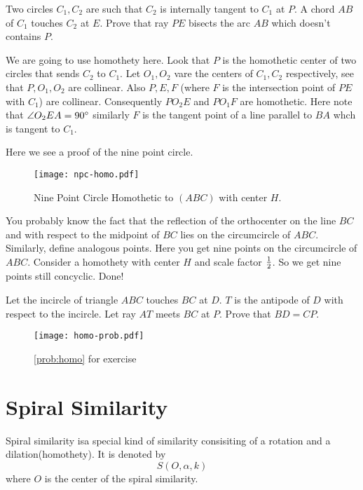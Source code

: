 \begin{example}
Two circles $C_1, C_2$ are such that $C_2$ is internally tangent  to $C_1$ at $P$. A chord $AB$ of $C_1$ touches $C_2$ at $E$. Prove that ray $PE$ bisects the arc $AB$ which doesn't contains $P$.
\end{example}

We are going to use homothety here. Look
 that $P$ is the homothetic center of two 
 circles that sends $C_2$ to $C_1$.
Let $O_1, O_2$ vare the centers of $C_1, C_2$ respectively, see that $P,O_1,O_2$ are collinear.
Also $P,E,F$ (where $F$ is the intersection point of $PE$ with $C_1$) are collinear. Consequently $PO_2E$ and $PO_1F$ are homothetic. Here note that $\angle O_2EA=90^\circ$ similarly $F$ is the tangent point of a line parallel to $BA$ whch is tangent to $C_1$. 

Here we see a proof of the nine point circle.
\begin{figure}[H]
\centering
	\texttt{[image: npc-homo.pdf]}%
	\caption{Nine Point Circle Homothetic to $(ABC)$ with center $H$.}
\end{figure}
You probably know the fact that the reflection of the orthocenter on the line $BC$ and with respect to the midpoint of $BC$ lies on the circumcircle of $ABC$.
Similarly, define analogous points.
Here you get nine points on the circumcircle of $ABC$. Consider a homothety with center $H$ and scale factor $\frac{1}{2}$. So we get nine points still concyclic. Done!

\begin{problem}\label{prob:homo}
Let the incircle of triangle $ABC$ touches $BC$ at $D$. $T$ is the antipode of $D$ with respect to the incircle. Let ray $AT$ meets $BC$ at $P$. Prove that $BD=CP.$
\end{problem}


\begin{figure}[ht]
\centering
	\texttt{[image: homo-prob.pdf]}
	\caption{\autoref{prob:homo} for exercise}
\end{figure}

\section{Spiral Similarity}
Spiral similarity isa special kind of similarity consisiting of a rotation and a dilation(homothety). It is denoted by \[S (O,\alpha ,k)\] where $O$ is the center of the spiral similarity.

